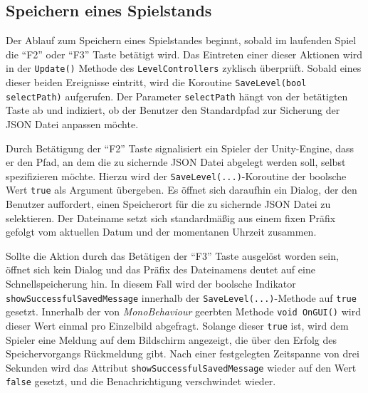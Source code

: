 
\subsection{Speichern eines Spielstands}
%

Der Ablauf zum Speichern eines Spielstandes beginnt, sobald im laufenden Spiel die "`F2"' oder "`F3"' Taste betätigt wird. Das Eintreten einer dieser Aktionen wird in der \texttt{Update()} Methode des \texttt{LevelControllers} zyklisch überprüft. Sobald eines dieser beiden Ereignisse eintritt, wird die Koroutine \texttt{SaveLevel(bool selectPath)} aufgerufen. Der Parameter \texttt{selectPath} hängt von der betätigten Taste ab und indiziert, ob der Benutzer den Standardpfad zur Sicherung der JSON Datei anpassen möchte. 

Durch Betätigung der "`F2"' Taste signalisiert ein Spieler der Unity-Engine, dass er den Pfad, an dem die zu sichernde JSON Datei abgelegt werden soll, selbst spezifizieren möchte. Hierzu wird der \texttt{SaveLevel(...)}-Koroutine der boolsche Wert \texttt{true} als Argument übergeben. Es öffnet sich daraufhin ein Dialog, der den Benutzer auffordert, einen Speicherort für die zu sichernde JSON Datei zu selektieren. Der Dateiname setzt sich standardmäßig aus einem fixen Präfix gefolgt vom aktuellen Datum und der momentanen Uhrzeit zusammen. 

Sollte die Aktion durch das Betätigen der "`F3"' Taste ausgelöst worden sein, öffnet sich kein Dialog und das Präfix des Dateinamens deutet auf eine Schnellspeicherung hin. In diesem Fall wird der boolsche Indikator \texttt{showSuccessfulSavedMessage} innerhalb der \texttt{SaveLevel(...)}-Methode auf \texttt{true} gesetzt. Innerhalb der von \textit{MonoBehaviour} geerbten Methode \texttt{void OnGUI()} wird dieser Wert einmal pro Einzelbild abgefragt. Solange dieser \texttt{true} ist, wird dem Spieler eine Meldung auf dem Bildschirm angezeigt, die über den Erfolg des Speichervorgangs Rückmeldung gibt. Nach einer festgelegten Zeitspanne von drei Sekunden wird das Attribut \texttt{showSuccessfulSavedMessage} wieder auf den Wert \texttt{false} gesetzt, und die Benachrichtigung verschwindet wieder.

